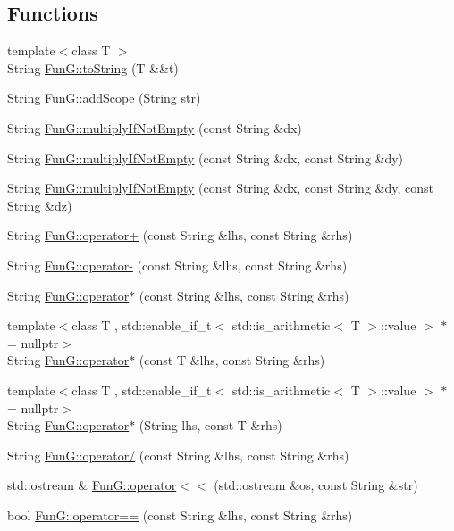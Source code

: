 \subsection*{Functions}
\begin{DoxyCompactItemize}
\item 
{\footnotesize template$<$class T $>$ }\\String \hyperlink{namespaceFunG_a3ba37cdd71d527a2f15d09a7c886de43}{Fun\-G\-::to\-String} (T \&\&t)
\item 
String \hyperlink{namespaceFunG_a262dd18fdad9a576780b797fc2070cb2}{Fun\-G\-::add\-Scope} (String str)
\item 
String \hyperlink{namespaceFunG_a2bb32fe9e9cd8e52b21f191024bbf865}{Fun\-G\-::multiply\-If\-Not\-Empty} (const String \&dx)
\item 
String \hyperlink{namespaceFunG_aa63a97fd8a8b9edc6a4b68ede627a7f2}{Fun\-G\-::multiply\-If\-Not\-Empty} (const String \&dx, const String \&dy)
\item 
String \hyperlink{namespaceFunG_aa63312a6768b8c8bc3b13b89b79bb458}{Fun\-G\-::multiply\-If\-Not\-Empty} (const String \&dx, const String \&dy, const String \&dz)
\item 
String \hyperlink{namespaceFunG_a77777736a53db19e90aec100b2bf19eb}{Fun\-G\-::operator+} (const String \&lhs, const String \&rhs)
\item 
String \hyperlink{namespaceFunG_aa9fb6597d25acc448cad0a5542a34c36}{Fun\-G\-::operator-\/} (const String \&lhs, const String \&rhs)
\item 
String \hyperlink{namespaceFunG_a2d7abd41ff8bf6668ac483f27b695c68}{Fun\-G\-::operator$\ast$} (const String \&lhs, const String \&rhs)
\item 
{\footnotesize template$<$class T , std\-::enable\-\_\-if\-\_\-t$<$ std\-::is\-\_\-arithmetic$<$ T $>$\-::value $>$ $\ast$  = nullptr$>$ }\\String \hyperlink{namespaceFunG_ab9af9ae286e75b48ade1131d34f83dd2}{Fun\-G\-::operator$\ast$} (const T \&lhs, const String \&rhs)
\item 
{\footnotesize template$<$class T , std\-::enable\-\_\-if\-\_\-t$<$ std\-::is\-\_\-arithmetic$<$ T $>$\-::value $>$ $\ast$  = nullptr$>$ }\\String \hyperlink{namespaceFunG_a46702905ca56369a7c0790e674dbff2c}{Fun\-G\-::operator$\ast$} (String lhs, const T \&rhs)
\item 
String \hyperlink{namespaceFunG_ab267e162b5fa99ad8244512d4c32d60d}{Fun\-G\-::operator/} (const String \&lhs, const String \&rhs)
\item 
std\-::ostream \& \hyperlink{namespaceFunG_a50f870064559f02c5e91f44ad52087a9}{Fun\-G\-::operator$<$$<$} (std\-::ostream \&os, const String \&str)
\item 
bool \hyperlink{namespaceFunG_a45449d94c35ab23a7b5a10a628891d62}{Fun\-G\-::operator==} (const String \&lhs, const String \&rhs)
\end{DoxyCompactItemize}
